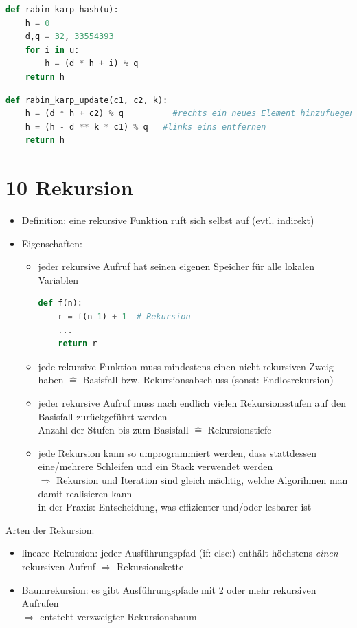 \documentclass[11pt, fleqn]{scrreprt}
\begin{document}
\begin{lstlisting}[language=Python]
def rabin_karp_hash(u):
	h = 0
	d,q = 32, 33554393
	for i in u:
		h = (d * h + i) % q
	return h
\end{lstlisting}

\begin{lstlisting}[language=Python]
def rabin_karp_update(c1, c2, k):
	h = (d * h + c2) % q   		  #rechts ein neues Element hinzufuegen
	h = (h - d ** k * c1) % q   #links eins entfernen
	return h
\end{lstlisting}
\chapter*{10 Rekursion}
\begin{itemize}[label={}]
	\item \hspace*{-1cm} Definition: eine rekursive Funktion ruft sich selbst auf (evtl. indirekt)
	\item \hspace*{-1cm} Eigenschaften: 
	\begin{itemize}
		\item jeder rekursive Aufruf hat seinen eigenen Speicher für alle lokalen Variablen
		\begin{lstlisting}[language=Python]
def f(n):
	r = f(n-1) + 1  # Rekursion
	...
	return r
		\end{lstlisting}
		\item jede rekursive Funktion muss mindestens einen nicht-rekursiven Zweig haben $\widehat{=}$ Basisfall bzw. Rekursionsabschluss (sonst: Endlosrekursion)
		\item jeder rekursive Aufruf muss nach endlich vielen Rekursionsstufen auf den Basisfall zurückgeführt werden \\
		Anzahl der Stufen bis zum Basisfall $\widehat{=}$ Rekursionstiefe
		\item jede Rekursion kann so umprogrammiert werden, dass stattdessen eine/mehrere Schleifen und ein Stack verwendet werden \\
		$\Rightarrow$ Rekursion und Iteration sind gleich mächtig, welche Algorihmen man damit realisieren kann \\
		in der Praxis: Entscheidung, was effizienter und/oder lesbarer ist
	\end{itemize}
\end{itemize}

Arten der Rekursion:
\begin{itemize}
	\item lineare Rekursion: jeder Ausführungspfad (if: else:) enthält höchstens \emph{einen} rekursiven Aufruf $\Rightarrow$ Rekursionskette
	\item Baumrekursion: es gibt Ausführungspfade mit 2 oder mehr rekursiven Aufrufen \\
	$\Rightarrow$ entsteht verzweigter Rekursionsbaum
\end{itemize}
\end{document}
